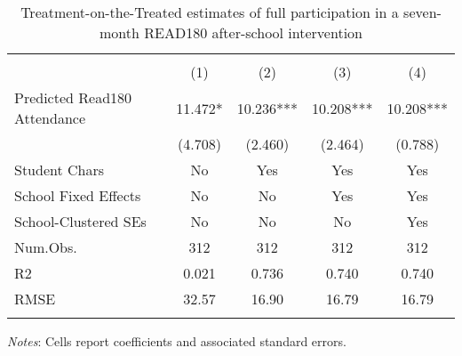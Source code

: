\begin{table}

\caption{Treatment-on-the-Treated estimates of full participation in a seven-month READ180 after-school intervention \label{tab:tot}}
\centering
\begin{threeparttable}
\begin{tabular}[t]{lcccc}
\hline 
\hline \\[-1.8ex] 
  & (1) & (2) & (3) & (4)\\
\midrule
Predicted Read180 Attendance & 11.472* & 10.236*** & 10.208*** & 10.208***\\
 & (4.708) & (2.460) & (2.464) & (0.788)\\
\midrule
Student Chars & No & Yes & Yes & Yes\\
School Fixed Effects & No & No & Yes & Yes\\
School-Clustered SEs & No & No & No & Yes\\
Num.Obs. & 312 & 312 & 312 & 312\\
R2 & 0.021 & 0.736 & 0.740 & 0.740\\
RMSE & 32.57 & 16.90 & 16.79 & 16.79\\
\hline 
\hline \\[-1.8ex] 
\end{tabular}
\begin{tablenotes}
\item \small \textit{Notes}: Cells report coefficients and associated standard errors.
\end{tablenotes}
\end{threeparttable}
\end{table}
